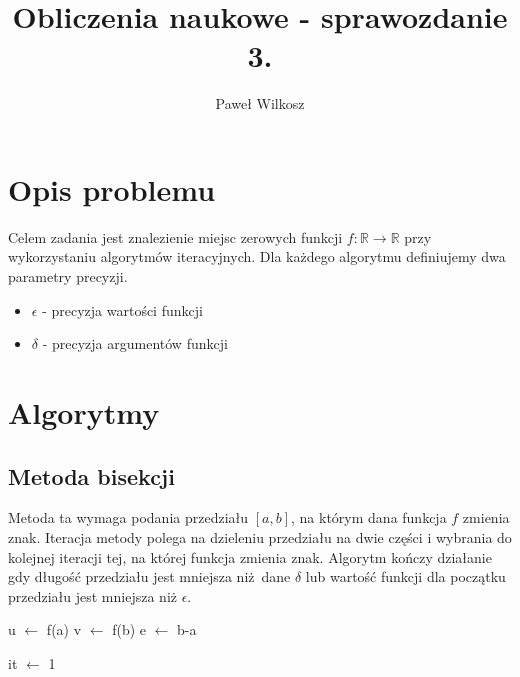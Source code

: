 \documentclass{article}
\author{Paweł Wilkosz}
\title{Obliczenia naukowe - sprawozdanie 3.}
\begin{document}
\maketitle

\section{Opis problemu}

Celem zadania jest znalezienie miejsc zerowych funkcji $f: \mathbb{R} \to \mathbb{R}$ przy wykorzystaniu algorytmów iteracyjnych.
Dla każdego algorytmu definiujemy dwa parametry precyzji.
\begin{itemize}
  \item $\epsilon$ - precyzja wartości funkcji
  \item $\delta$ - precyzja argumentów funkcji
\end{itemize}

\section{Algorytmy}

\subsection{Metoda bisekcji}
Metoda ta wymaga podania przedziału $[a,b]$, na którym dana funkcja $f$ zmienia znak.
Iteracja metody polega na dzieleniu przedziału na dwie części i wybrania do kolejnej iteracji tej, na której funkcja zmienia znak.
Algorytm kończy działanie gdy długość przedziału jest mniejsza niż dane $\delta$ lub wartość funkcji dla początku przedziału jest mniejsza niż $\epsilon$.

\begin{algorithm}[H]

  u $\leftarrow$ f(a)
  v $\leftarrow$ f(b)
  e $\leftarrow$ b-a


  it $\leftarrow$ 1

\end{algorithm}
\end{document}

